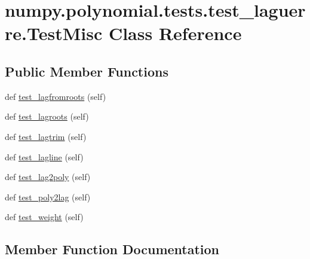\hypertarget{classnumpy_1_1polynomial_1_1tests_1_1test__laguerre_1_1TestMisc}{}\section{numpy.\+polynomial.\+tests.\+test\+\_\+laguerre.\+Test\+Misc Class Reference}
\label{classnumpy_1_1polynomial_1_1tests_1_1test__laguerre_1_1TestMisc}
\subsection*{Public Member Functions}
\begin{DoxyCompactItemize}
\item 
def \hyperlink{classnumpy_1_1polynomial_1_1tests_1_1test__laguerre_1_1TestMisc_ad141398e14745e9c83f44dea56a69b9b}{test\+\_\+lagfromroots} (self)
\item 
def \hyperlink{classnumpy_1_1polynomial_1_1tests_1_1test__laguerre_1_1TestMisc_a47ee71e027cb5ebe2c6faf6d5a418552}{test\+\_\+lagroots} (self)
\item 
def \hyperlink{classnumpy_1_1polynomial_1_1tests_1_1test__laguerre_1_1TestMisc_a4cf685e0c052adc761cc458b6e3ec9f3}{test\+\_\+lagtrim} (self)
\item 
def \hyperlink{classnumpy_1_1polynomial_1_1tests_1_1test__laguerre_1_1TestMisc_aa9215cd9960458034ee2499211fc6fa3}{test\+\_\+lagline} (self)
\item 
def \hyperlink{classnumpy_1_1polynomial_1_1tests_1_1test__laguerre_1_1TestMisc_a00dcfa41ef9fc76195c7ee72d9eb3127}{test\+\_\+lag2poly} (self)
\item 
def \hyperlink{classnumpy_1_1polynomial_1_1tests_1_1test__laguerre_1_1TestMisc_a9a7c280e70f5f1ed77cbd62f401095d7}{test\+\_\+poly2lag} (self)
\item 
def \hyperlink{classnumpy_1_1polynomial_1_1tests_1_1test__laguerre_1_1TestMisc_a587c8b8da244a959b1b7e1ff25f72cd3}{test\+\_\+weight} (self)
\end{DoxyCompactItemize}


\subsection{Member Function Documentation}
\mbox{\label{classnumpy_1_1polynomial_1_1tests_1_1test__laguerre_1_1TestMisc_a00dcfa41ef9fc76195c7ee72d9eb3127}} 
